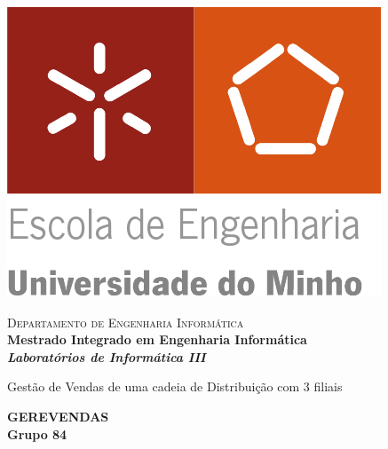 \begin{titlepage}


\begin{minipage}{0.3\textwidth}
\begin{flushleft} 
\includegraphics[width=\textwidth]{logo.png}
\end{flushleft}
\end{minipage}
\begin{minipage}{0.6\textwidth}
\begin{flushright} 

\textsc{Departamento de Engenharia Informática}\\[0.1cm]
\bfseries Mestrado Integrado em Engenharia Informática \\ [0.1cm]
\bfseries \textit{Laboratórios de Informática III}\\[8mm]

\end{flushright}
\end{minipage}


\vspace{3cm}


\begin{center}


\LARGE Gestão de Vendas de uma cadeia de Distribuição com 3 filiais

\Large \textbf{GEREVENDAS}\\[1.5cm]


{\Large \bfseries Grupo 84\\[2cm] }



\end{center}
\end{titlepage}
